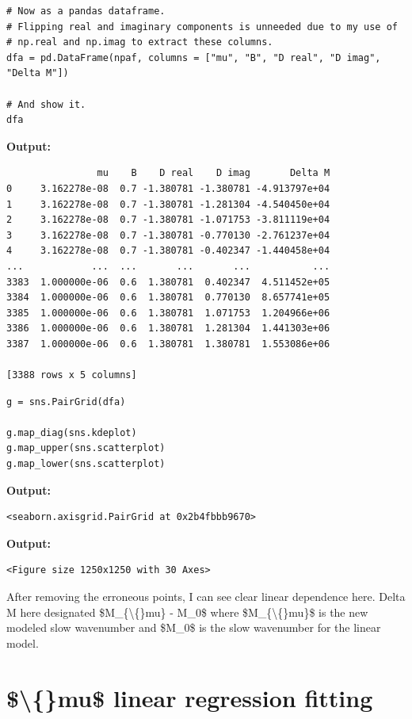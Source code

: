 \documentclass{article}
\begin{document}
\begin{lstlisting}
# Now as a pandas dataframe.
# Flipping real and imaginary components is unneeded due to my use of
# np.real and np.imag to extract these columns.
dfa = pd.DataFrame(npaf, columns = ["mu", "B", "D real", "D imag", "Delta M"])

# And show it.
dfa\end{lstlisting}

\textbf{Output:}\begin{verbatim}
                mu    B    D real    D imag       Delta M
0     3.162278e-08  0.7 -1.380781 -1.380781 -4.913797e+04
1     3.162278e-08  0.7 -1.380781 -1.281304 -4.540450e+04
2     3.162278e-08  0.7 -1.380781 -1.071753 -3.811119e+04
3     3.162278e-08  0.7 -1.380781 -0.770130 -2.761237e+04
4     3.162278e-08  0.7 -1.380781 -0.402347 -1.440458e+04
...            ...  ...       ...       ...           ...
3383  1.000000e-06  0.6  1.380781  0.402347  4.511452e+05
3384  1.000000e-06  0.6  1.380781  0.770130  8.657741e+05
3385  1.000000e-06  0.6  1.380781  1.071753  1.204966e+06
3386  1.000000e-06  0.6  1.380781  1.281304  1.441303e+06
3387  1.000000e-06  0.6  1.380781  1.380781  1.553086e+06

[3388 rows x 5 columns]
\end{verbatim}

\begin{lstlisting}
g = sns.PairGrid(dfa)

g.map_diag(sns.kdeplot)
g.map_upper(sns.scatterplot)
g.map_lower(sns.scatterplot)\end{lstlisting}

\textbf{Output:}\begin{verbatim}
<seaborn.axisgrid.PairGrid at 0x2b4fbbb9670>
\end{verbatim}

\textbf{Output:}\begin{verbatim}
<Figure size 1250x1250 with 30 Axes>
\end{verbatim}

After removing the erroneous points, I can see clear linear dependence here. Delta M here designated \$M\_\{\textbackslash\{\}mu\} - M\_0\$ where \$M\_\{\textbackslash\{\}mu\}\$ is the new modeled slow wavenumber and \$M\_0\$ is the slow wavenumber for the linear model.

\section{\$\textbackslash\{\}mu\$ linear regression fitting}
\end{document}
